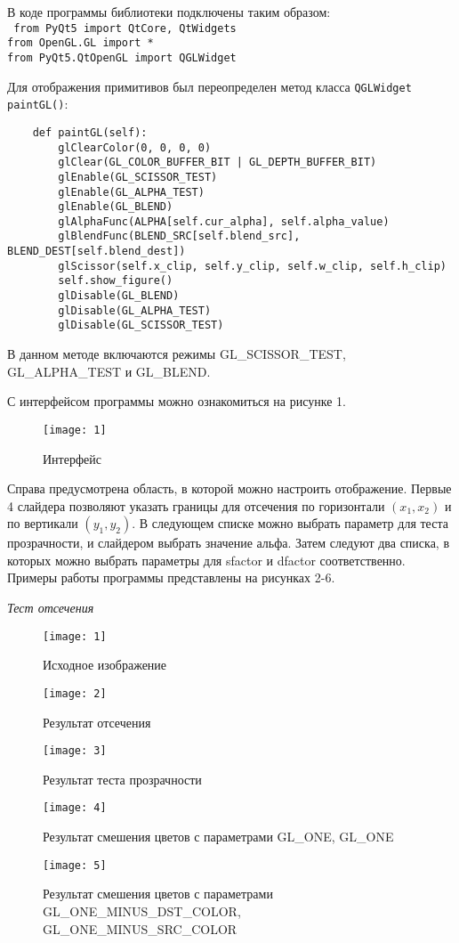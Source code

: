 В коде программы библиотеки подключены таким образом:\\
\texttt{
    from PyQt5 import QtCore, QtWidgets \\
    from OpenGL.GL import * \\
    from PyQt5.QtOpenGL import QGLWidget
}

Для отображения примитивов был переопределен метод класса \texttt{QGLWidget paintGL()}:

\small{
    \begin{verbatim}
    def paintGL(self):
        glClearColor(0, 0, 0, 0)
        glClear(GL_COLOR_BUFFER_BIT | GL_DEPTH_BUFFER_BIT)
        glEnable(GL_SCISSOR_TEST)
        glEnable(GL_ALPHA_TEST)
        glEnable(GL_BLEND)
        glAlphaFunc(ALPHA[self.cur_alpha], self.alpha_value)
        glBlendFunc(BLEND_SRC[self.blend_src], BLEND_DEST[self.blend_dest])
        glScissor(self.x_clip, self.y_clip, self.w_clip, self.h_clip)
        self.show_figure()
        glDisable(GL_BLEND)
        glDisable(GL_ALPHA_TEST)
        glDisable(GL_SCISSOR_TEST)
    \end{verbatim}}
\normalsize
В данном методе включаются режимы GL\_SCISSOR\_TEST,\\ GL\_ALPHA\_TEST и GL\_BLEND.

С интерфейсом программы можно ознакомиться на рисунке 1.
\begin{figure}[H]
    \centering
    \texttt{[image: 1]}
    \caption{Интерфейс}
    \label{fig:1}
\end{figure}

Справа предусмотрена область, в которой можно настроить отображение.
Первые 4 слайдера позволяют указать границы для отсечения по горизонтали $(x_1, x_2)$ и по вертикали $(y_1, y_2)$.
В следующем списке можно выбрать параметр для теста прозрачности, и слайдером выбрать значение альфа.
Затем следуют два списка, в которых можно выбрать параметры для sfactor и dfactor соответственно.
Примеры работы программы представлены на рисунках 2-6.

\textit{Тест отсечения}
\begin{figure}[H]
    \centering
    \texttt{[image: 1]}
    \caption{Исходное изображение}
    \label{fig:2}
\end{figure}
\begin{figure}[H]
    \centering
    \texttt{[image: 2]}
    \caption{Результат отсечения}
    \label{fig:3}
\end{figure}
\begin{figure}[H]
    \centering
    \texttt{[image: 3]}
    \caption{Результат теста прозрачности}
    \label{fig:4}
\end{figure}
\begin{figure}[H]
    \centering
    \texttt{[image: 4]}
    \caption{Результат смешения цветов с параметрами GL\_ONE, GL\_ONE}
    \label{fig:5}
\end{figure}
\begin{figure}[H]
    \centering
    \texttt{[image: 5]}
    \caption{Результат смешения цветов с параметрами GL\_ONE\_MINUS\_DST\_COLOR, GL\_ONE\_MINUS\_SRC\_COLOR}
    \label{fig:6}
\end{figure}

